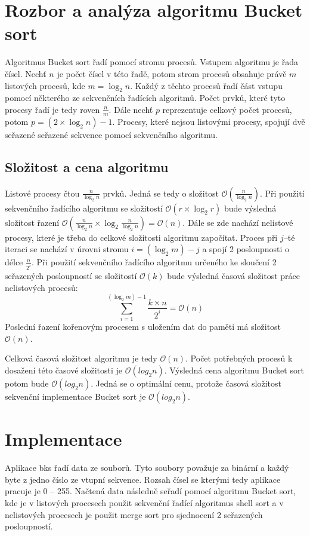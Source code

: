\documentclass[11pt,a4paper,titlepage]{article}
\begin{document}
    \section{Rozbor a analýza algoritmu Bucket sort}
        Algoritmus Bucket sort řadí pomocí stromu procesů. Vstupem algoritmu je řada čísel.
        Nechť $n$ je počet čísel v této řadě, potom strom procesů obsahuje právě $m$ listových
        procesů, kde $m = \log_2 n$. Každý z těchto procesů řadí část vstupu pomocí některého
        ze sekvenčních řadících algoritmů. Počet prvků, které tyto procesy řadí je tedy roven $\frac{n}{m}$.
        Dále nechť $p$ reprezentuje celkový počet procesů, potom $p = (2 \times \log_2 n) - 1$.
        Procesy, které nejsou listovými procesy, spojují dvě seřazené seřazené sekvence pomocí
        sekvenčního algoritmu.
        
        \subsection{Složitost a cena algoritmu}
        Listové procesy čtou $\frac{n}{\log_2 n}$ prvků. Jedná se tedy o složitost $\mathcal{O}(\frac{n}{\log_2 n})$.
        Při použití sekvenčního řadícího algoritmu se složitostí $\mathcal{O}(r \times \log_2 r )$ bude výsledná složitost
        řazení $\mathcal{O}(\frac{n}{\log_2 n} \times \log_2 \frac{n}{\log_2 n}) = \mathcal{O}(n)$. Dále se zde nachází
        nelistové procesy, které je třeba do celkové složitosti algoritmu započítat. Proces při $j$--té iteraci se nachází
        v úrovni stromu $i = (\log_2 m) - j$ a spojí 2 posloupnosti o délce $\frac{n}{2^i}$. Při použití sekvenčního řadícího
        algoritmu určeného ke sloučení 2 seřazených posloupností se složitostí $\mathcal{O}(k)$ bude výsledná časová složitost
        práce nelistových procesů:
        $$\sum_{i=1}^{(\log_2 m) - 1} \frac{k \times n}{2^i} = \mathcal{O}(n)$$
        Poslední řazení kořenovým procesem s uložením dat do paměti má složitost $\mathcal{O}(n)$.
        
        Celková časová složitost algoritmu je tedy $\mathcal{O}(n)$. Počet potřebných procesů k dosažení této
        časové složitosti je $\mathcal{O}(log_2 n)$. Výsledná cena algoritmu Bucket sort potom bude $\mathcal{O}(log_2 n)$.
        Jedná se o optimální cenu, protože časová složitost sekvenční implementace Bucket sort je $\mathcal{O}(log_2 n)$.

	\section{Implementace}
        Aplikace bks řadí data ze souborů. Tyto soubory považuje za binární a každý byte z jedno číslo ze vtupní sekvence.
        Rozsah čísel se kterými tedy aplikace pracuje je 0 -- 255. Načtená data následně seřadí pomocí algoritmu Bucket sort,
        kde je v listových procesech použit sekvenční řadící algoritmus shell sort a v nelistových procesech je použit
        merge sort pro sjednocení 2 seřazených posloupností.
        
\end{document}
